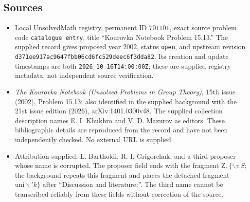 \documentclass[11pt]{article}
\begin{document}
\subsection{Sources}
\begin{itemize}
\item Local UnsolvedMath registry, permanent ID \(701101\), exact source problem code \texttt{catalogue entry}, title ``Kourovka Notebook Problem 15.13.'' The supplied record gives proposed year \(2002\), status \texttt{open}, and upstream revision \texttt{d371ee917ac9647fbb06cd6fc529deec6f3dda82}. Its creation and update timestamps are both \texttt{2026-10-16T14:00:00Z}; these are supplied registry metadata, not independent source verification.
\item \emph{The Kourovka Notebook (Unsolved Problems in Group Theory)}, 15th issue (2002), Problem 15.13; also identified in the supplied background with the 21st issue edition (2026), arXiv:1401.0300v48. The supplied collection description names E. I. Khukhro and V. D. Mazurov as editors. These bibliographic details are reproduced from the record and have not been independently checked. No external URL is supplied.
\item Attribution supplied: L. Bartholdi, R. I. Grigorchuk, and a third proposer whose name is corrupted. The proposer field ends with the fragment \(\mathrm{Z.}\ \{\backslash v\,S\); the background repeats this fragment and places the detached fragment \(\mathrm{uni}\backslash{}'k\}\) after ``Discussion and literature:''. The third name cannot be transcribed reliably from these fields without correction of the source.
\end{itemize}
\end{document}

